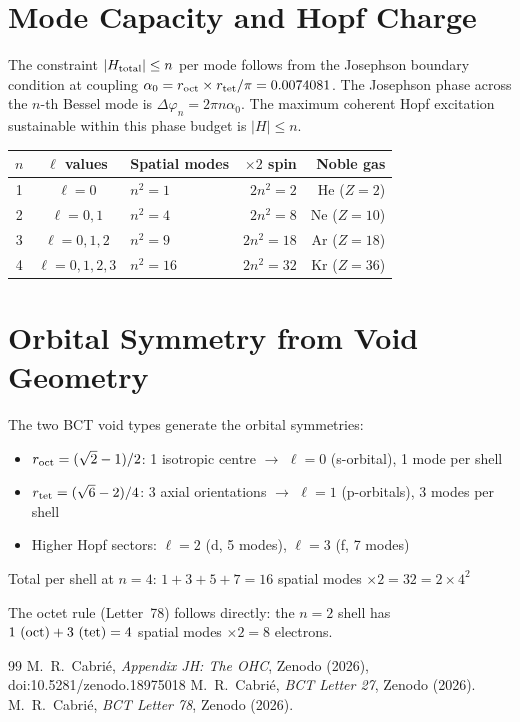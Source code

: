 \documentclass[aps,prl,twocolumn,showpacs,superscriptaddress]{revtex4-2}
\begin{document}
\section{Mode Capacity and Hopf Charge}

The constraint $|H_{\rm total}|\leq n$ per mode follows from the 
Josephson boundary condition at coupling $\alpha_0 = r_{\rm oct}
\times r_{\rm tet}/\pi = 0.0074081$. The Josephson phase across 
the $n$-th Bessel mode is $\Delta\varphi_n = 2\pi n\alpha_0$. 
The maximum coherent Hopf excitation sustainable within this phase 
budget is $|H|\leq n$.

\begin{center}
\begin{tabular}{cclrr}
\toprule
$n$ & $\ell$ values & Spatial modes & $\times2$ spin & Noble gas \\
\midrule
1 & $\ell=0$ & $n^2=1$ & $2n^2=2$ & He ($Z=2$) \\
2 & $\ell=0,1$ & $n^2=4$ & $2n^2=8$ & Ne ($Z=10$) \\
3 & $\ell=0,1,2$ & $n^2=9$ & $2n^2=18$ & Ar ($Z=18$) \\
4 & $\ell=0,1,2,3$ & $n^2=16$ & $2n^2=32$ & Kr ($Z=36$) \\
\bottomrule
\end{tabular}
\end{center}

\section{Orbital Symmetry from Void Geometry}

The two BCT void types generate the orbital symmetries:
\begin{itemize}
\item $r_{\rm oct} = (\sqrt{2}-1)/2$: 1 isotropic centre 
$\to$ $\ell=0$ (s-orbital), 1 mode per shell
\item $r_{\rm tet} = (\sqrt{6}-2)/4$: 3 axial orientations 
$\to$ $\ell=1$ (p-orbitals), 3 modes per shell
\item Higher Hopf sectors: $\ell=2$ (d, 5 modes), $\ell=3$ (f, 7 modes)
\end{itemize}

Total per shell at $n=4$: $1+3+5+7=16$ spatial modes $\times 2 = 
32 = 2\times4^2$ \checkmark

The octet rule (Letter~78) follows directly: the $n=2$ shell has 
$1~({\rm oct}) + 3~({\rm tet}) = 4$ spatial modes $\times 2 = 8$ electrons.

\begin{thebibliography}{99}
 M.~R.~Cabri\'e, \textit{Appendix JH: The OHC},
Zenodo (2026), doi:10.5281/zenodo.18975018
 M.~R.~Cabri\'e, \textit{BCT Letter 27}, Zenodo (2026).
 M.~R.~Cabri\'e, \textit{BCT Letter 78}, Zenodo (2026).
\end{thebibliography}
\end{document}
